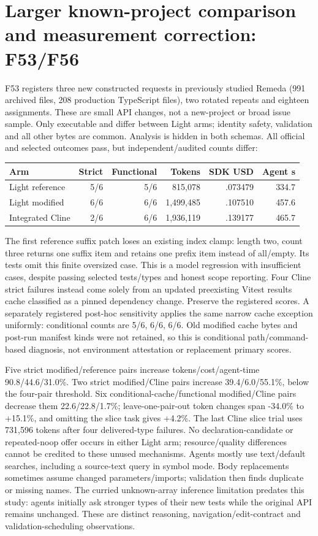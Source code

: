 \documentclass[11pt,a4paper]{article}
\newcommand{\code}[1]{\texttt{\detokenize{#1}}}
\begin{document}
\section{Larger known-project comparison and measurement correction: F53/F56}
F53 registers three new constructed requests in previously studied Remeda
(991 archived files, 208 production TypeScript files), two rotated repeats and
eighteen assignments. These are small API changes, not a new-project or broad
issue sample. Only executable \code{light-edit.js} and
\code{light-reference-search.js} differ between Light arms; identity safety,
validation and all other bytes are common. Analysis is hidden in both schemas.
All official and selected outcomes pass, but independent/audited counts differ:
\begin{center}\begin{tabular}{lrrrrr}
\toprule Arm & Strict & Functional & Tokens & SDK USD & Agent s \\\midrule
Light reference & 5/6 & 5/6 & 815,078 & .073479 & 334.7 \\
Light modified & 6/6 & 6/6 & 1,499,485 & .107510 & 457.6 \\
Integrated Cline & 2/6 & 6/6 & 1,936,119 & .139177 & 465.7 \\\bottomrule
\end{tabular}\end{center}
The first reference suffix patch loses an existing index clamp: length two,
count three returns one suffix item and retains one prefix item instead of
all/empty. Its tests omit this finite oversized case. This is a model regression
with insufficient cases, despite passing selected tests/types and honest scope
reporting. Four Cline strict failures instead come solely from an updated
preexisting Vitest results cache classified as a pinned dependency change.
Preserve the registered scores. A separately registered post-hoc sensitivity
applies the same narrow cache exception uniformly: conditional counts are
5/6, 6/6, 6/6. Old modified cache bytes and post-run manifest kinds were not
retained, so this is conditional path/command-based diagnosis, not environment
attestation or replacement primary scores.

Five strict modified/reference pairs increase tokens/cost/agent-time
90.8/44.6/31.0\%. Two strict modified/Cline pairs increase
39.4/6.0/55.1\%, below the four-pair threshold. Six conditional-cache/functional
modified/Cline pairs decrease them 22.6/22.8/1.7\%; leave-one-pair-out token
changes span -34.0\% to +15.1\%, and omitting the slice task gives +4.2\%.
The last Cline slice trial uses 731,596 tokens after four delivered-type failures.
No declaration-candidate or repeated-noop offer occurs in either Light arm;
resource/quality differences cannot be credited to these unused mechanisms.
Agents mostly use text/default searches, including a source-text query in symbol
mode. Body replacements sometimes assume changed parameters/imports; validation
then finds duplicate or missing names. The curried \code{splitAt} unknown-array
inference limitation predates this study: agents initially ask stronger types
of their new tests while the original API remains unchanged. These are distinct
reasoning, navigation/edit-contract and validation-scheduling observations.
\end{document}
